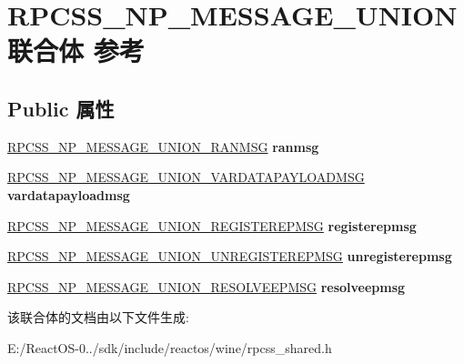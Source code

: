\hypertarget{union_r_p_c_s_s___n_p___m_e_s_s_a_g_e___u_n_i_o_n}{}\section{R\+P\+C\+S\+S\+\_\+\+N\+P\+\_\+\+M\+E\+S\+S\+A\+G\+E\+\_\+\+U\+N\+I\+O\+N联合体 参考}
\label{union_r_p_c_s_s___n_p___m_e_s_s_a_g_e___u_n_i_o_n}
\subsection*{Public 属性}
\begin{DoxyCompactItemize}
\item 
\mbox{\label{union_r_p_c_s_s___n_p___m_e_s_s_a_g_e___u_n_i_o_n_a8a39161f09f98d05246733693099e270}} 
\hyperlink{struct___r_p_c_s_s___n_p___m_e_s_s_a_g_e___u_n_i_o_n___r_a_n_m_s_g}{R\+P\+C\+S\+S\+\_\+\+N\+P\+\_\+\+M\+E\+S\+S\+A\+G\+E\+\_\+\+U\+N\+I\+O\+N\+\_\+\+R\+A\+N\+M\+SG} {\bfseries ranmsg}
\item 
\mbox{\label{union_r_p_c_s_s___n_p___m_e_s_s_a_g_e___u_n_i_o_n_a85bdb500bf45dc4076d1aff0017a27a1}} 
\hyperlink{struct___r_p_c_s_s___n_p___m_e_s_s_a_g_e___u_n_i_o_n___v_a_r_d_a_t_a_p_a_y_l_o_a_d_m_s_g}{R\+P\+C\+S\+S\+\_\+\+N\+P\+\_\+\+M\+E\+S\+S\+A\+G\+E\+\_\+\+U\+N\+I\+O\+N\+\_\+\+V\+A\+R\+D\+A\+T\+A\+P\+A\+Y\+L\+O\+A\+D\+M\+SG} {\bfseries vardatapayloadmsg}
\item 
\mbox{\label{union_r_p_c_s_s___n_p___m_e_s_s_a_g_e___u_n_i_o_n_afa5e389796c006c6ab5ec103cfbc28c1}} 
\hyperlink{struct___r_p_c_s_s___n_p___m_e_s_s_a_g_e___u_n_i_o_n___r_e_g_i_s_t_e_r_e_p_m_s_g}{R\+P\+C\+S\+S\+\_\+\+N\+P\+\_\+\+M\+E\+S\+S\+A\+G\+E\+\_\+\+U\+N\+I\+O\+N\+\_\+\+R\+E\+G\+I\+S\+T\+E\+R\+E\+P\+M\+SG} {\bfseries registerepmsg}
\item 
\mbox{\label{union_r_p_c_s_s___n_p___m_e_s_s_a_g_e___u_n_i_o_n_ac1c92c5f00ec87704bca8cce283dccd3}} 
\hyperlink{struct___r_p_c_s_s___n_p___m_e_s_s_a_g_e___u_n_i_o_n___u_n_r_e_g_i_s_t_e_r_e_p_m_s_g}{R\+P\+C\+S\+S\+\_\+\+N\+P\+\_\+\+M\+E\+S\+S\+A\+G\+E\+\_\+\+U\+N\+I\+O\+N\+\_\+\+U\+N\+R\+E\+G\+I\+S\+T\+E\+R\+E\+P\+M\+SG} {\bfseries unregisterepmsg}
\item 
\mbox{\label{union_r_p_c_s_s___n_p___m_e_s_s_a_g_e___u_n_i_o_n_acf74331535b380d97083f5b625f3915f}} 
\hyperlink{struct___r_p_c_s_s___n_p___m_e_s_s_a_g_e___u_n_i_o_n___r_e_s_o_l_v_e_e_p_m_s_g}{R\+P\+C\+S\+S\+\_\+\+N\+P\+\_\+\+M\+E\+S\+S\+A\+G\+E\+\_\+\+U\+N\+I\+O\+N\+\_\+\+R\+E\+S\+O\+L\+V\+E\+E\+P\+M\+SG} {\bfseries resolveepmsg}
\end{DoxyCompactItemize}


该联合体的文档由以下文件生成\+:\begin{DoxyCompactItemize}
\item 
E\+:/\+React\+O\+S-\/0../sdk/include/reactos/wine/rpcss\+\_\+shared.\+h\end{DoxyCompactItemize}
